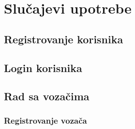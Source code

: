 \section{\bfseries Slu\v cajevi upotrebe}

\subsection{\bfseries Registrovanje korisnika}
\subsection{\bfseries Login korisnika}


\subsection{\bfseries Rad sa vozačima}
\subsubsection{\bfseries Registrovanje vozača}

